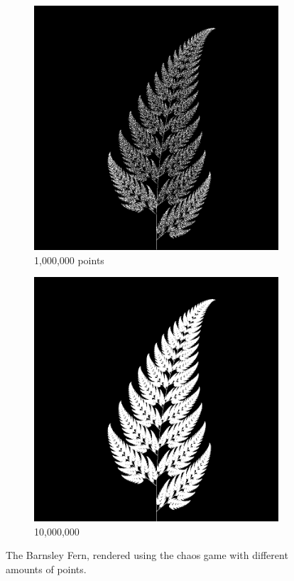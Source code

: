 \documentclass[11pt]{article}
\begin{document}
\begin{figure}
     \centering
     \begin{subfigure}[b]{0.4\textwidth}
         \centering
         \includegraphics[width=\textwidth]{figures/barnsley_1000000}
         \caption{1,000,000 points}
         \label{figure:barnsley_mil}
     \end{subfigure}
     \hfill
     \begin{subfigure}[b]{0.4\textwidth}
         \centering
         \includegraphics[width=\textwidth]{figures/barnsley_100000000}
         \caption{10,000,000}
         \label{figure:barnsley_ten_mil}
     \end{subfigure}
        \caption{The Barnsley Fern, rendered using the chaos game with different amounts of points.}
        \label{figure:barnsley_chaos_game_points}
\end{figure}
\end{document}
